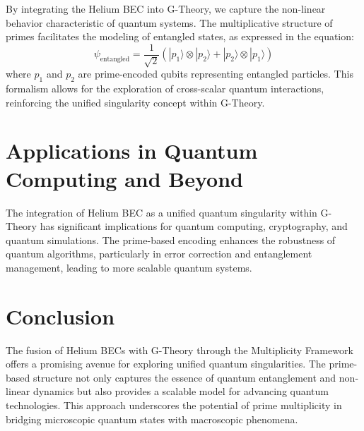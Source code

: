 \documentclass[%
 preprint, linenumbers,
 amsmath,amssymb,
 aps, physrev,
]{revtex4-2}
\begin{document}
By integrating the Helium BEC into G-Theory, we capture the non-linear behavior characteristic of quantum systems. The multiplicative structure of primes facilitates the modeling of entangled states, as expressed in the equation:
\[
\psi_{\text{entangled}} = \frac{1}{\sqrt{2}} (| p_1 \rangle \otimes | p_2 \rangle + | p_2 \rangle \otimes | p_1 \rangle)
\]
where \( p_1 \) and \( p_2 \) are prime-encoded qubits representing entangled particles. This formalism allows for the exploration of cross-scalar quantum interactions, reinforcing the unified singularity concept within G-Theory.

\section{Applications in Quantum Computing and Beyond}

The integration of Helium BEC as a unified quantum singularity within G-Theory has significant implications for quantum computing, cryptography, and quantum simulations. The prime-based encoding enhances the robustness of quantum algorithms, particularly in error correction and entanglement management, leading to more scalable quantum systems.

\section{Conclusion}

The fusion of Helium BECs with G-Theory through the Multiplicity Framework offers a promising avenue for exploring unified quantum singularities. The prime-based structure not only captures the essence of quantum entanglement and non-linear dynamics but also provides a scalable model for advancing quantum technologies. This approach underscores the potential of prime multiplicity in bridging microscopic quantum states with macroscopic phenomena.
\end{document}
